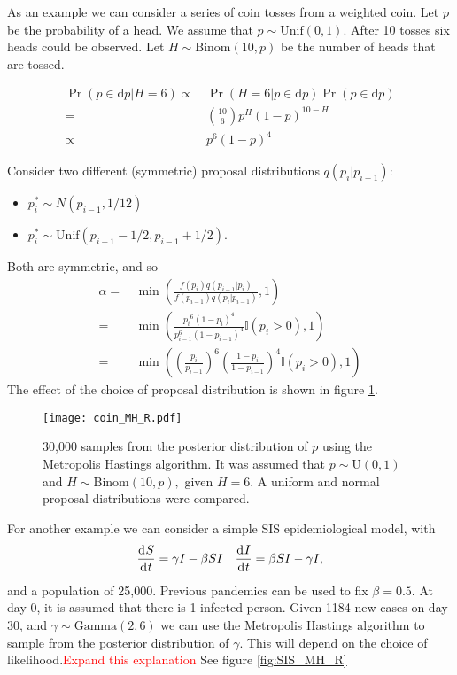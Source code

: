 As an example we can consider a series of coin tosses from a weighted coin. Let $p$ be the probability of a head. We assume that $p\sim\mathrm{Unif}(0,1).$ After 10 tosses six heads could be observed. Let $H\sim\mathrm{Binom}(10, p)$ be the number of heads that are tossed.

\begin{align*}
    \Pr(p\in\mathrm{d}p| H= 6)\propto & \, \Pr(H= 6|p\in\mathrm{d}p)\Pr(p\in\mathrm{d}p) \\
    =                                 & \, \binom{10}{6} p^H(1 - p)^{10 - H}             \\
    \propto                           & \, p^6(1 - p)^{4}
\end{align*}

Consider two different (symmetric) proposal distributions $q(p_i|p_{i - 1})$: \begin{itemize}
    \item $p_i^* \sim N(p_{i - 1}, 1/12)$
    \item $p_i^* \sim \mathrm{Unif}(p_{i - 1} - 1/2, p_{i - 1} + 1/2)$.
\end{itemize} Both are symmetric, and so \begin{align*}
    \alpha = & \, \min\left(\frac{f(p_i)q(p_{i - 1}|p_{i})}{f(p_{i - 1})q(p_i|p_{i - 1})}, 1\right)                                         \\
    =        & \, \min\left(\frac{{p_i}^{6}(1 - p_i)^4}{p_{i - 1}^6(1 - p_{i - 1})^4}\mathbb{I}(p_i > 0), 1\right)                          \\
    =        & \, \min\left(\left(\frac{p_i}{p_{i - 1}}\right)^{6}\left(\frac{1 - p_i}{1 - p_{i - 1}}\right)^4\mathbb{I}(p_i > 0), 1\right)
\end{align*} The effect of the choice of proposal distribution is shown in figure \ref{fig:coin_R}.

\begin{figure}[htbp]
    \centering
    \texttt{[image: coin\_MH\_R.pdf]}
    \caption{30,000 samples from the posterior distribution of $p$ using the Metropolis Hastings algorithm. It was assumed that $p\sim \mathrm{U}(0,1)$ and $H \sim \mathrm{Binom}(10, p),$ given $H = 6.$ A uniform and normal proposal distributions were compared.}
    \label{fig:coin_R}
\end{figure}

For another example we can consider a simple SIS epidemiological model, with $$\frac{\diff S}{\diff t} = \gamma I - \beta SI \quad \frac{\diff I}{\diff t} = \beta SI -  \gamma I,$$ and a population of 25,000. Previous pandemics can be used to fix $\beta = 0.5.$ At day 0, it is assumed that there is 1 infected person. Given 1184 new cases on day 30, and $\gamma\sim \mathrm{Gamma}(2, 6)$ we can use the Metropolis Hastings algorithm to sample from the posterior distribution of $\gamma.$  This will depend on the choice of likelihood.\textcolor{red}{Expand this explanation} See figure \ref{fig:SIS_MH_R}

